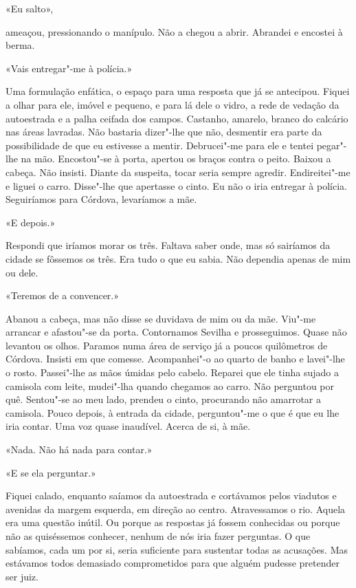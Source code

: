 «Eu salto»,

ameaçou, pressionando o manípulo. Não a chegou a abrir. Abrandei e
encostei à berma.

«Vais entregar"-me à polícia.»

Uma formulação enfática, o espaço para uma resposta que já se antecipou.
Fiquei a olhar para ele, imóvel e pequeno, e para lá dele o vidro, a
rede de vedação da autoestrada e a palha ceifada dos campos. Castanho,
amarelo, branco do calcário nas áreas lavradas. Não bastaria dizer"-lhe
que não, desmentir era parte da possibilidade de que eu estivesse a
mentir. Debrucei"-me para ele e tentei pegar"-lhe na mão. Encostou"-se à
porta, apertou os braços contra o peito. Baixou a cabeça. Não insisti.
Diante da suspeita, tocar seria sempre agredir. Endireitei"-me e liguei
o carro. Disse"-lhe que apertasse o cinto. Eu não o iria entregar à
polícia. Seguiríamos para Córdova, levaríamos a mãe.

«E depois.»

Respondi que iríamos morar os três. Faltava saber onde, mas só sairíamos
da cidade se fôssemos os três. Era tudo o que eu sabia. Não dependia
apenas de mim ou dele.

«Teremos de a convencer.»

Abanou a cabeça, mas não disse se duvidava de mim ou da mãe. Viu"-me
arrancar e afastou"-se da porta. Contornamos Sevilha e prosseguimos.
Quase não levantou os olhos. Paramos numa área de serviço já a poucos
quilômetros de Córdova. Insisti em que comesse. Acompanhei"-o ao quarto
de banho e lavei"-lhe o rosto. Passei"-lhe as mãos úmidas pelo cabelo.
Reparei que ele tinha sujado a camisola com leite, mudei"-lha quando
chegamos ao carro. Não perguntou por quê. Sentou"-se ao meu lado, prendeu
o cinto, procurando não amarrotar a camisola. Pouco depois, à entrada da
cidade, perguntou"-me o que é que eu lhe iria contar. Uma voz quase
inaudível. Acerca de si, à mãe.

«Nada. Não há nada para contar.»

«E se ela perguntar.»

Fiquei calado, enquanto saíamos da autoestrada e cortávamos pelos
viadutos e avenidas da margem esquerda, em direção ao centro.
Atravessamos o rio. Aquela era uma questão inútil. Ou porque as
respostas já fossem conhecidas ou porque não as quiséssemos conhecer,
nenhum de nós iria fazer perguntas. O que sabíamos, cada um por si,
seria suficiente para sustentar todas as acusações. Mas estávamos todos
demasiado comprometidos para que alguém pudesse pretender ser juiz.

